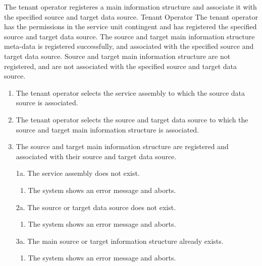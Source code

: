 {The tenant operator registeres a main information structure and associate it with the specified source and target data source.}
{Tenant Operator}
{The tenant operator has the permissions in the service unit contingent and has registered the specified source and target data source.}
{The source and target main information structure meta-data is registered successfully, and associated with the specified source and target data source.}
{Source and target main information structure are not registered, and are not associated with the specified source and target data source.}
{\begin{enumerate}
	\item The tenant operator selects the service assembly to which the source data source is associated.
	\item The tenant operator selects the source and target data source to which the source and target main information structure is associated.
	\item The source and target main information structure are registered and associated with their source and target data source.
\end{enumerate}}
{\begin{enumerate}
	\item[1a.] The service assembly does not exist.
		\begin{enumerate}
			\item The system shows an error message and aborts.
		\end{enumerate}
	\item[2a.] The source or target data source does not exist.
		\begin{enumerate}
			\item The system shows an error message and aborts.
		\end{enumerate}
	\item[3a.] The main source or target information structure already exists.
		\begin{enumerate}
			\item The system shows an error message and aborts.
		\end{enumerate}
\end{enumerate}}

